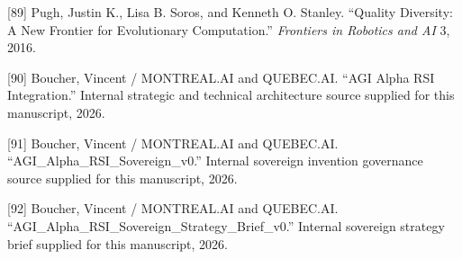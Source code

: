 {[}89{]} Pugh, Justin K., Lisa B. Soros, and Kenneth O. Stanley.
``Quality Diversity: A New Frontier for Evolutionary Computation.''
\emph{Frontiers in Robotics and AI} 3, 2016.

{[}90{]} Boucher, Vincent / MONTREAL.AI and QUEBEC.AI. ``AGI Alpha RSI
Integration.'' Internal strategic and technical architecture source
supplied for this manuscript, 2026.

{[}91{]} Boucher, Vincent / MONTREAL.AI and QUEBEC.AI.
``AGI\_Alpha\_RSI\_Sovereign\_v0.'' Internal sovereign invention
governance source supplied for this manuscript, 2026.

{[}92{]} Boucher, Vincent / MONTREAL.AI and QUEBEC.AI.
``AGI\_Alpha\_RSI\_Sovereign\_Strategy\_Brief\_v0.'' Internal sovereign
strategy brief supplied for this manuscript, 2026.
